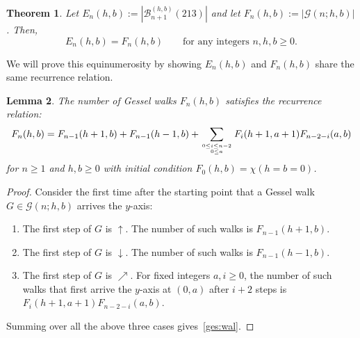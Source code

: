 \documentclass[12pt]{amsart}
\numberwithin{equation}{section}
\theoremstyle{plain}
\newtheorem{theorem}{Theorem}[section]
\newtheorem{lemma}[theorem]{Lemma}
\theoremstyle{definition}
\newcommand{\B}{\mathcal{B}}
\newcommand{\G}{\mathcal{G}}
\begin{document}
\begin{theorem}\label{ges:213}
Let $E_n(h,b):=|\B_{n+1}^{(h,b)}(213)|$ and let $F_n(h,b):=|\G(n;h,b)|$. Then,
\begin{equation}\label{iden:ges213}
E_n(h,b)=F_n(h,b)\qquad\text{for any integers $n,h,b\geq0$}. 
\end{equation}
\end{theorem}
We will prove this equinumerosity by showing $E_n(h,b)$ and $F_n(h,b)$ share  the same recurrence relation. 

\begin{lemma}\label{lem:ges}
The number of Gessel walks $F_n(h,b)$ satisfies the recurrence relation:
\begin{equation}\label{ges:wal}
F_n(h,b)=F_{n-1}(h+1,b)+F_{n-1}(h-1,b)+\sum_{0\leq i\leq n-2\atop{0\leq a}}F_i(h+1,a+1)F_{n-2-i}(a,b)
\end{equation}
for $n\geq1$ and $h,b\geq0$ with initial condition $F_0(h,b)=\chi(h=b=0)$.
\end{lemma}
\begin{proof}
Consider the first time after the starting point that a Gessel walk $G\in\G(n;h,b)$ arrives the $y$-axis: 
\begin{enumerate}
\item The first step of $G$ is $\uparrow$. The number of such walks is $F_{n-1}(h+1,b)$.
\item The first step of $G$ is $\downarrow$. The number of such walks is $F_{n-1}(h-1,b)$.
\item The first step of $G$ is $\nearrow$. For fixed integers $a,i\geq0$, the number of such walks that first arrive the $y$-axis at $(0,a)$ after $i+2$ steps is $F_i(h+1,a+1)F_{n-2-i}(a,b)$.
\end{enumerate}
Summing over all the above three cases gives~\eqref{ges:wal}.
\end{proof}
\end{document}
